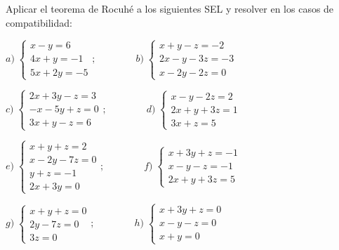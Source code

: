\begin{ejre}
	
	Aplicar el teorema de Rocuhé a los siguientes SEL y resolver en los casos de compatibilidad:
	
	$a) \; \begin{cases} x-y=6\\4x+y=-1\\5x+2y=-5  \end{cases} ; \qquad \qquad b)\; \begin{cases} x+y-z=-2\\2x-y-3z=-3\\x-2y-2z=0  \end{cases}$
	
	$c) \; \begin{cases} 2x+3y-z=3\\-x-5y+z=0\\3x+y-z=6  \end{cases} ; \qquad \qquad d)\; \begin{cases}   x-y-2z=2\\2x+y+3z=1\\3x+z=5\end{cases}$
	
	$e) \; \begin{cases}  x+y+z=2\\x-2y-7z=0\\y+z=-1\\2x+3y=0 \end{cases} ; \qquad \qquad f)\; \begin{cases}   x+3y+z=-1\\x-y-z=-1\\2x+y+3z=5\end{cases}$
	
	$g) \; \begin{cases}  x+y+z=0\\2y-7z=0\\3z=0 \end{cases} ; \qquad \qquad h)\; \begin{cases}   x+3y+z=0\\x-y-z=0\\x+y=0\end{cases}$
	
	
\end{ejre}
	

